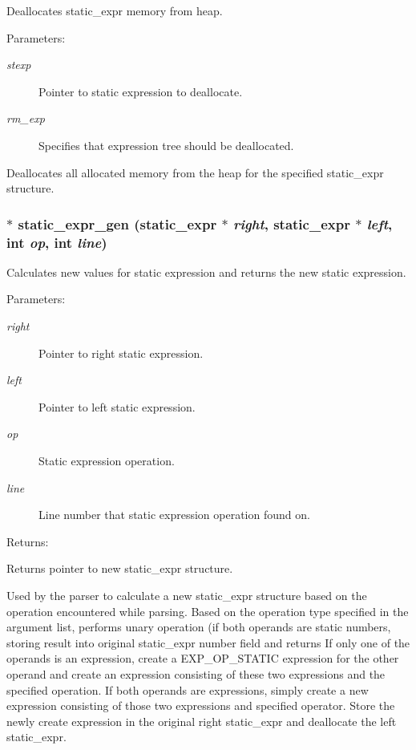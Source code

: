 Deallocates static\_\-expr memory from heap.

\begin{Desc}
\item[Parameters: ]\par
\begin{description}
\item[{\em 
stexp}]Pointer to static expression to deallocate. \item[{\em 
rm\_\-exp}]Specifies that expression tree should be deallocated.\end{description}
\end{Desc}
Deallocates all allocated memory from the heap for the specified static\_\-expr structure. 
\subsubsection{$\ast$ static\_\-expr\_\-gen ({\bf static\_\-expr} $\ast$ {\em right}, {\bf static\_\-expr} $\ast$ {\em left}, int {\em op}, int {\em line})}\label{static_8c_a1}


Calculates new values for static expression and returns the new static expression.

\begin{Desc}
\item[Parameters: ]\par
\begin{description}
\item[{\em 
right}]Pointer to right static expression. \item[{\em 
left}]Pointer to left static expression. \item[{\em 
op}]Static expression operation. \item[{\em 
line}]Line number that static expression operation found on.\end{description}
\end{Desc}
\begin{Desc}
\item[Returns: ]\par
Returns pointer to new static\_\-expr structure.\end{Desc}
Used by the parser to calculate a new static\_\-expr structure based on the operation encountered while parsing. Based on the operation type specified in the argument list, performs unary operation (if both operands are static numbers, storing result into original static\_\-expr number field and returns If only one of the operands is an expression, create a EXP\_\-OP\_\-STATIC expression for the other operand and create an expression consisting of these two expressions and the specified operation. If both operands are expressions, simply create a new expression consisting of those two expressions and specified operator. Store the newly create expression in the original right static\_\-expr and deallocate the left static\_\-expr. 

